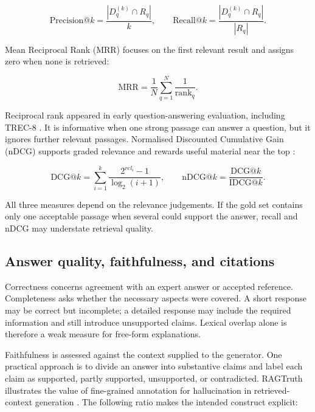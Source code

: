 \begin{equation}
\mathrm{Precision@}k=\frac{|D_q^{(k)}\cap R_q|}{k},
\qquad
\mathrm{Recall@}k=\frac{|D_q^{(k)}\cap R_q|}{|R_q|}.
\label{eq:precision-recall-k}
\end{equation}

Mean Reciprocal Rank (MRR) focuses on the first relevant result and assigns zero when none is retrieved:

\begin{equation}
\mathrm{MRR}=\frac{1}{N}\sum_{q=1}^{N}\frac{1}{\mathrm{rank}_q}.
\label{eq:mrr}
\end{equation}

Reciprocal rank appeared in early question-answering evaluation, including TREC-8 \parencite{voorhees1999}. It is informative when one strong passage can answer a question, but it ignores further relevant passages. Normalised Discounted Cumulative Gain (nDCG) supports graded relevance and rewards useful material near the top \parencite{jarvelin2002}:

\begin{equation}
\mathrm{DCG@}k=\sum_{i=1}^{k}\frac{2^{rel_i}-1}{\log_2(i+1)},
\qquad
\mathrm{nDCG@}k=\frac{\mathrm{DCG@}k}{\mathrm{IDCG@}k}.
\label{eq:ndcg}
\end{equation}

All three measures depend on the relevance judgements. If the gold set contains only one acceptable passage when several could support the answer, recall and nDCG may understate retrieval quality.

\subsection{Answer quality, faithfulness, and citations}

Correctness concerns agreement with an expert answer or accepted reference. Completeness asks whether the necessary aspects were covered. A short response may be correct but incomplete; a detailed response may include the required information and still introduce unsupported claims. Lexical overlap alone is therefore a weak measure for free-form explanations.

Faithfulness is assessed against the context supplied to the generator. One practical approach is to divide an answer into substantive claims and label each claim as supported, partly supported, unsupported, or contradicted. RAGTruth illustrates the value of fine-grained annotation for hallucination in retrieved-context generation \parencite{niu2024ragtruth}. The following ratio makes the intended construct explicit:


